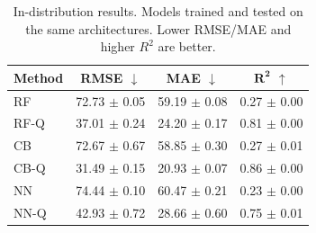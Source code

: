 \begin{table}[t]
    \centering
    \caption{In-distribution results. Models trained and tested on the same architectures. Lower RMSE/MAE and higher $R^2$ are better.}
    \label{tab:id-results}
    \begin{tabular}{lccc}
        \toprule
        \textbf{Method} & \textbf{RMSE} $\downarrow$ & \textbf{MAE} $\downarrow$ & $\boldsymbol{R^2}$ $\uparrow$ \\
        \midrule
        RF      & 72.73 $\pm$ 0.05 & 59.19 $\pm$ 0.08 & 0.27 $\pm$ 0.00 \\
        RF-Q    & 37.01 $\pm$ 0.24 & 24.20 $\pm$ 0.17 & 0.81 $\pm$ 0.00 \\
        \midrule
        CB      & 72.67 $\pm$ 0.67 & 58.85 $\pm$ 0.30 & 0.27 $\pm$ 0.01 \\
        CB-Q    & 31.49 $\pm$ 0.15 & 20.93 $\pm$ 0.07 & 0.86 $\pm$ 0.00 \\
        \midrule
        NN      & 74.44 $\pm$ 0.10 & 60.47 $\pm$ 0.21 & 0.23 $\pm$ 0.00 \\
        NN-Q    & 42.93 $\pm$ 0.72 & 28.66 $\pm$ 0.60 & 0.75 $\pm$ 0.01 \\
        \bottomrule
    \end{tabular}
\end{table}